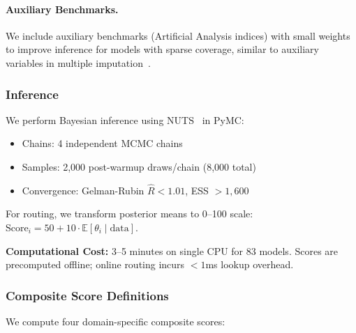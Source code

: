 \paragraph{Auxiliary Benchmarks.}
We include auxiliary benchmarks (Artificial Analysis indices) with small weights to improve inference for models with sparse coverage, similar to auxiliary variables in multiple imputation~\cite{rubin1987multiple}.

\subsubsection{Inference}

We perform Bayesian inference using NUTS~\cite{hoffman2014nuts} in PyMC:
%
\begin{itemize}[nosep]
\item Chains: 4 independent MCMC chains
\item Samples: 2,000 post-warmup draws/chain (8,000 total)
\item Convergence: Gelman-Rubin $\hat{R} < 1.01$, ESS $> 1{,}600$
\end{itemize}
%
For routing, we transform posterior means to 0--100 scale: $\text{Score}_i = 50 + 10 \cdot \mathbb{E}[\theta_i \mid \text{data}]$.

\textbf{Computational Cost:} 3--5 minutes on single CPU for 83 models. Scores are precomputed offline; online routing incurs $<1$ms lookup overhead.

\subsubsection{Composite Score Definitions}

We compute four domain-specific composite scores:

